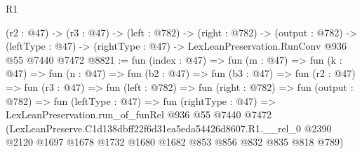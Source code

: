 \begin{lexlean}{R1}
\begin{coremodule}
  (r2 : @47) ->
  (r3 : @47) ->
  (left : @782) ->
  (right : @782) ->
  (output : @782) ->
  (leftType : @47) -> (rightType : @47) -> LexLeanPreservation.RunConv @936 @55 @7440 @7472
@8821 := fun (index : @47) =>
  fun (m : @47) =>
  fun (k : @47) =>
  fun (n : @47) =>
  fun (b2 : @47) =>
  fun (b3 : @47) =>
  fun (r2 : @47) =>
  fun (r3 : @47) =>
  fun (left : @782) =>
  fun (right : @782) =>
  fun (output : @782) =>
  fun (leftType : @47) =>
  fun (rightType : @47) =>
  LexLeanPreservation.run_of_funRel
    @936
    @55
    @7440
    @7472
    (LexLeanPreserve.C1d138dbff22f6d31ea5eda54426d8607.R1.__rel_0
      @2390
      @2120
      @1697
      @1678
      @1732
      @1680
      @1682
      @853
      @856
      @832
      @835
      @818
      @789)
\end{coremodule}
\end{lexlean}

